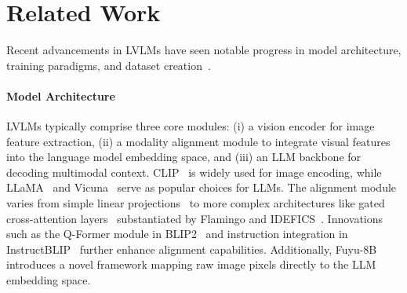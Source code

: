 \section{Related Work}
\label{sec:related}
Recent advancements in LVLMs have seen notable progress in model architecture, training paradigms, and dataset creation~\citep{zhang2024mm}.

\paragraph{Model Architecture} LVLMs typically comprise three core modules: (i) a vision encoder for image feature extraction, (ii) a modality alignment module to integrate visual features into the language model embedding space, and (iii) an LLM backbone for decoding multimodal context. 
CLIP~\citep{radford2021clip} is widely used for image encoding, while LLaMA~\citep{touvron2023llama} and Vicuna~\citep{vicuna2023} serve as popular choices for LLMs. 
The alignment module varies from simple linear projections~\citep{liu2023llava,zhu2023minigpt4} to more complex architectures like gated cross-attention layers~ substantiated by Flamingo and IDEFICS~\citep{Alayrac2022FlamingoAV,awadalla2023openflamingo}. Innovations such as the Q-Former module in BLIP2~\citep{li2023blip2} and instruction integration in InstructBLIP~\citep{dai2023instructblip} further enhance alignment capabilities. 
Additionally, Fuyu-8B~\citep{fuyu-8b} introduces a novel framework mapping raw image pixels directly to the LLM embedding space.


